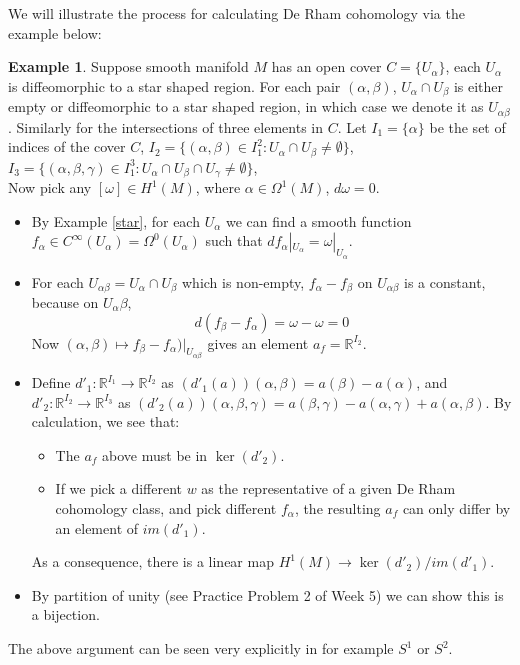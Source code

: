 \documentclass{article}
\theoremstyle{definition}
\newtheorem{exm}[thm]{Example}
\begin{document}
We will illustrate the process for calculating De Rham cohomology via the example below:

\begin{exm}
    Suppose smooth manifold $M$ has an open cover $C=\{U_{\alpha}\}$, each $U_\alpha$ is diffeomorphic to a star shaped region. For each pair $(\alpha, \beta)$, $U_\alpha\cap U_\beta$ is either empty or diffeomorphic to a star shaped region, in which case we denote it as $U_{\alpha\beta}$. Similarly for the intersections of three elements in $C$. Let $I_1=\{\alpha\}$ be the set of indices of the cover $C$, $I_2=\{(\alpha, \beta)\in I_1^2: U_\alpha\cap U_\beta\not=\emptyset\}$, $I_3=\{(\alpha, \beta, \gamma)\in I_1^3: U_\alpha\cap U_\beta\cap U_\gamma\not=\emptyset\}$,\\

    Now pick any $[\omega]\in H^1(M)$, where $\alpha\in \Omega^1(M)$, $d\omega=0$. 

    \begin{itemize}
    \item By Example \ref{star}, for each $U_\alpha$ we can find a smooth function $f_{\alpha}\in C^\infty(U_\alpha)=\Omega^0(U_\alpha)$ such that $df_\alpha|_{U_\alpha}=\omega|_{U_\alpha}$.
    \item For each $U_{\alpha\beta}=U_\alpha\cap U_\beta$ which is non-empty, $f_\alpha-f_\beta$ on $U_{\alpha\beta}$ is a constant, because on $U_\alpha\beta$,
    \[d(f_\beta-f_\alpha)=\omega-\omega=0\]
    Now $(\alpha, \beta)\mapsto f_{\beta}-f_{\alpha})|_{U_{\alpha\beta}}$ gives an element $a_f=\mathbb{R}^{I_2}$.
    \item Define $d'_1: \mathbb{R}^{I_1}\rightarrow\mathbb{R}^{I_2}$ as $(d'_1(a))(\alpha, \beta)=a(\beta)-a(\alpha)$, and $d'_2: \mathbb{R}^{I_2}\rightarrow \mathbb{R}^{I_3}$ as $(d'_2(a))(\alpha, \beta, \gamma)=a(\beta, \gamma)-a(\alpha, \gamma)+a(\alpha, \beta)$. By calculation, we see that:
    \begin{itemize}
        \item The $a_f$ above must be in $\ker(d'_2)$.
        \item If we pick a different $w$ as the representative of a given De Rham cohomology class, and pick different $f_\alpha$, the resulting $a_f$ can only differ by an element of $im(d'_1)$.
    \end{itemize}
    As a consequence, there is a linear map $H^1(M)\rightarrow \ker(d'_2)/im(d'_1)$.
    \item By partition of unity (see Practice Problem 2 of Week 5) we can show this is a bijection.
    \end{itemize}

    The above argument can be seen very explicitly in for example $S^1$ or $S^2$.
\end{exm}
\end{document}
